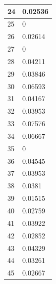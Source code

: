 \begin{tabular}{|l||l|}
	24 & 0.02536 \\ \hline
	25 & 0 \\ \hline
	26 & 0.02614 \\ \hline
	27 & 0 \\ \hline
	28 & 0.04211 \\ \hline
	29 & 0.03846 \\ \hline
	30 & 0.06593 \\ \hline
	31 & 0.04167 \\ \hline
	32 & 0.03953 \\ \hline
	33 & 0.07576 \\ \hline
	34 & 0.06667 \\ \hline
	35 & 0 \\ \hline
	36 & 0.04545 \\ \hline
	37 & 0.03953 \\ \hline
	38 & 0.0381 \\ \hline
	39 & 0.01515 \\ \hline
	40 & 0.02759 \\ \hline
	41 & 0.03922 \\ \hline
	42 & 0.02852 \\ \hline
	43 & 0.04329 \\ \hline
	44 & 0.03261 \\ \hline
	45 & 0.02667 \\ \hline
\end{tabular}
